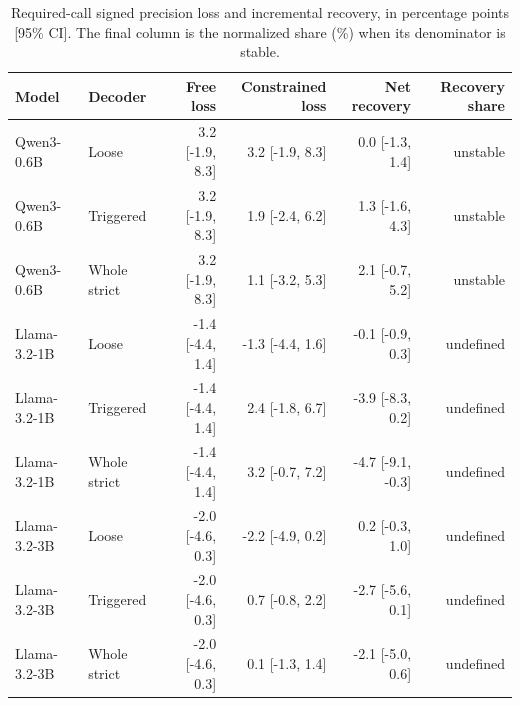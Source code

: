 \begin{table}[t]\centering\scriptsize
\caption{Required-call signed precision loss and incremental recovery, in percentage points [95\% CI]. The final column is the normalized share (\%) when its denominator is stable.}
\begin{tabular}{llrrrr}\toprule
Model & Decoder & Free loss & Constrained loss & Net recovery & Recovery share \\\midrule
Qwen3-0.6B & Loose & 3.2 [-1.9, 8.3] & 3.2 [-1.9, 8.3] & 0.0 [-1.3, 1.4] & unstable \\
Qwen3-0.6B & Triggered & 3.2 [-1.9, 8.3] & 1.9 [-2.4, 6.2] & 1.3 [-1.6, 4.3] & unstable \\
Qwen3-0.6B & Whole strict & 3.2 [-1.9, 8.3] & 1.1 [-3.2, 5.3] & 2.1 [-0.7, 5.2] & unstable \\
Llama-3.2-1B & Loose & -1.4 [-4.4, 1.4] & -1.3 [-4.4, 1.6] & -0.1 [-0.9, 0.3] & undefined \\
Llama-3.2-1B & Triggered & -1.4 [-4.4, 1.4] & 2.4 [-1.8, 6.7] & -3.9 [-8.3, 0.2] & undefined \\
Llama-3.2-1B & Whole strict & -1.4 [-4.4, 1.4] & 3.2 [-0.7, 7.2] & -4.7 [-9.1, -0.3] & undefined \\
Llama-3.2-3B & Loose & -2.0 [-4.6, 0.3] & -2.2 [-4.9, 0.2] & 0.2 [-0.3, 1.0] & undefined \\
Llama-3.2-3B & Triggered & -2.0 [-4.6, 0.3] & 0.7 [-0.8, 2.2] & -2.7 [-5.6, 0.1] & undefined \\
Llama-3.2-3B & Whole strict & -2.0 [-4.6, 0.3] & 0.1 [-1.3, 1.4] & -2.1 [-5.0, 0.6] & undefined \\
\bottomrule\end{tabular}\end{table}
